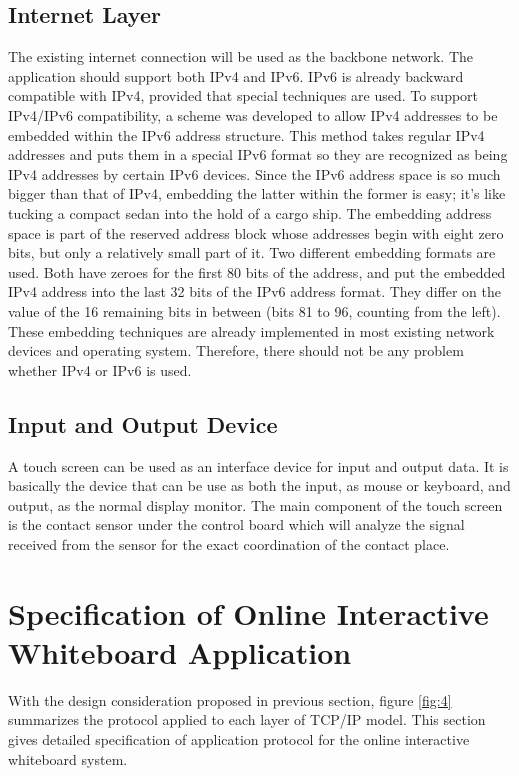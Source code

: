 \documentclass[conference]{IEEEtran}
\begin{document}
\subsection{Internet Layer}
The existing internet connection will be used as the backbone network. The application should support both IPv4 and IPv6. IPv6 is already backward compatible with IPv4, provided that special techniques are used. To support IPv4/IPv6 compatibility, a scheme was developed to allow IPv4 addresses to be embedded within the IPv6 address structure. This method takes regular IPv4 addresses and puts them in a special IPv6 format so they are recognized as being IPv4 addresses by certain IPv6 devices.
Since the IPv6 address space is so much bigger than that of IPv4, embedding the latter within the former is easy; it's like tucking a compact sedan into the hold of a cargo ship. The embedding address space is part of the reserved address block whose addresses begin with eight zero bits, but only a relatively small part of it. Two different embedding formats are used. Both have zeroes for the first 80 bits of the address, and put the embedded IPv4 address into the last 32 bits of the IPv6 address format. They differ on the value of the 16 remaining bits in between (bits 81 to 96, counting from the left). These embedding techniques are already implemented in most existing network devices and operating system. Therefore, there should not be any problem whether IPv4 or IPv6 is used.
\subsection{Input and Output Device}
A touch screen can be used as an interface device for input and output data. It is basically the device that can be use as both the input, as mouse or keyboard, and output, as the normal display monitor. The main component of the touch screen is the contact sensor under the control board which will analyze the signal received from the sensor for the exact coordination of the contact place. 

\section{Specification of Online Interactive Whiteboard Application}
With the design consideration proposed in previous section, figure \ref{fig:4} summarizes the protocol applied to each layer of TCP/IP model. This section gives detailed specification of application protocol for the online interactive whiteboard system.
 
\end{document}
